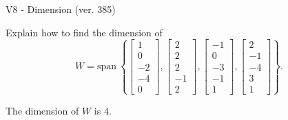 \begin{exercise}
  \begin{exerciseTitle}V8 - Dimension (ver. 385)\end{exerciseTitle}
  \begin{exerciseStatement}
    Explain how to find the dimension of 
\[W=\mathrm{span}\ \left\{\left[\begin{array}{r}
1 \\
0 \\
-2 \\
-4 \\
0
\end{array}\right] , \left[\begin{array}{r}
2 \\
2 \\
2 \\
-1 \\
2
\end{array}\right] , \left[\begin{array}{r}
-1 \\
0 \\
-3 \\
-1 \\
1
\end{array}\right] , \left[\begin{array}{r}
2 \\
-1 \\
-4 \\
3 \\
1
\end{array}\right]\right\}.\]



  \end{exerciseStatement}
  \begin{exerciseAnswer}
   The dimension of \(W\) is  \(4\).
  


  \end{exerciseAnswer}
\end{exercise}